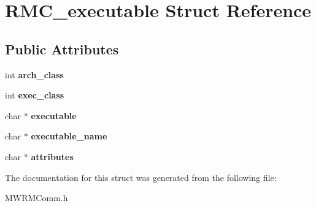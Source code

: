 \hypertarget{structRMC__executable}{}\section{R\+M\+C\+\_\+executable Struct Reference}
\label{structRMC__executable}
\subsection*{Public Attributes}
\begin{DoxyCompactItemize}
\item 
\mbox{\label{structRMC__executable_a577f7847db261e603218e6a02fe99148}} 
int {\bfseries arch\+\_\+class}
\item 
\mbox{\label{structRMC__executable_ad3fcd2281e800eeb4efcb30cf7d0f3d3}} 
int {\bfseries exec\+\_\+class}
\item 
\mbox{\label{structRMC__executable_a91a7c0633af8e46dd13836f0ba86f7c2}} 
char $\ast$ {\bfseries executable}
\item 
\mbox{\label{structRMC__executable_ac7ed456bddac2bb28c24b8075e6b3492}} 
char $\ast$ {\bfseries executable\+\_\+name}
\item 
\mbox{\label{structRMC__executable_a42bacab5c72c494d67ed8c7370d954ad}} 
char $\ast$ {\bfseries attributes}
\end{DoxyCompactItemize}


The documentation for this struct was generated from the following file\+:\begin{DoxyCompactItemize}
\item 
M\+W\+R\+M\+Comm.\+h\end{DoxyCompactItemize}

